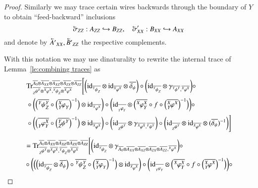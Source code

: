 \documentclass{amsart}
\def\tn{\textnormal}
\def\Trace{\tn{Tr}}
\def\ol{\overline}
\newcommand{\into}{\hookrightarrow}
\newcommand{\cev}[1]{\reflectbox{\ensuremath{\vec{\reflectbox{\ensuremath{#1}}}}}}
\def\id{\tn{id}}
\newcommand{\feeddd}[3]{{\tensor*[^{#2}_{\color{white}{!}}]{{#1}}{^{#3}}}}%
\newcommand{\feeddc}[3]{{\tensor*[^{#2}]{{#1}}{_{#3}}}}
\newcommand{\feedcd}[3]{{\tensor*[_{#2}]{{#1}}{^{#3}}}}
\newcommand{\feedcc}[3]{{\tensor*[^{\color{white}{!}}_{#2}]{{#1}}{_{#3}}}}
\newcommand{\feedda}[3]{{\tensor*[^{#2}_{\color{white}{!}}]{{#1}}{^{#2}_{#3}}}}
\newcommand{\feedca}[3]{{\tensor*[_{#2}]{{#1}}{_{#2}^{#3}}}}
\newcommand{\feedad}[3]{{\tensor*[^{#2}_{#3}]{{#1}}{^{#2}}}}
\newcommand{\feedac}[3]{{\tensor*[_{#2}^{#3}]{{#1}}{_{#2}}}}
\theoremstyle{remark}
\theoremstyle{definition}
\begin{document}
\begin{proof}
Similarly we may trace certain wires backwards through the boundary of $Y$ to obtain ``feed-backward'' inclusions
\[\cev{\sigma}_{ZZ}:A_{ZZ}\into B_{ZZ},\quad \cev{\sigma}'_{XX}:B_{XX}\into A_{XX}\]
and denote by $\cev{A'}_{XX},\cev{B'}_{ZZ}$ the respective complements.

With this notation we may use dinaturality to rewrite the internal trace of Lemma~\ref{le:combining traces} as
\begin{align*}
&\Trace^{\ol{A_0}\otimes\ol{A_{XX}}\otimes\ol{A_{XZ}}\otimes\ol{A_{ZX}}\otimes\ol{A_{ZZ}}}_{\ol{\feedcd{\psi}{Z}{Y}}\otimes\ol{\feeddd{\varphi}{X}{X}},\ol{\feeddc{\psi}{Y}{Z}}\otimes\ol{\feeddd{\varphi}{X}{X}}}\Bigg[\bigg(\id_{\ol{\feeddc{\psi}{Y}{Z}}}\otimes\id_{\ol{\feeddd{\varphi}{X}{X}}}\otimes\ol{\delta_\psi}\bigg)\circ
\bigg(\id_{\ol{\feeddc{\psi}{Y}{Z}}}\otimes\gamma_{\ol{\feeddd{\psi}{Y}{Y}},\ol{\feeddd{\varphi}{X}{X}}}\bigg)\circ\\
&\circ\bigg(\Big(\ol{\feedda{\psi}{Y}{Z}}\circ\Big(\ol{\feedac{\varphi}{Y}{X}}\Big)^{-1}\Big)\otimes\id_{\ol{\feeddd{\varphi}{X}{X}}}\bigg)\circ\bigg(\id_{\ol{\feedcc{\varphi}{Y}{Y}}}\otimes\Big(\ol{\feedda{\varphi}{X}{Y}}\circ f\circ\Big(\ol{\feedad{\varphi}{X}{Y}}\Big)^{-1}\Big)\bigg)\circ\\
&\circ\bigg(\Big(\ol{\feedca{\varphi}{Y}{X}}\circ\Big(\ol{\feedad{\psi}{Y}{Z}}\Big)^{-1}\Big)\otimes\id_{\ol{\feeddd{\varphi}{X}{X}}}\bigg)\circ\bigg(\id_{\ol{\feedcd{\psi}{Z}{Y}}}\otimes\gamma_{\ol{\feeddd{\varphi}{X}{X}},\ol{\feeddd{\psi}{Y}{Y}}}\bigg)\circ\bigg(\id_{\ol{\feedcd{\psi}{Z}{Y}}}\otimes\id_{\ol{\feeddd{\varphi}{X}{X}}}\otimes(\ol{\delta_\psi})^{-1}\bigg)\Bigg]\\
\end{align*}
\begin{align*}
&=\Trace^{\ol{A_0}\otimes\ol{A_{XX}}\otimes\ol{A_{XZ}}\otimes\ol{A_{ZX}}\otimes\ol{A_{ZZ}}}_{\ol{\feedcd{\psi}{Z}{Y}}\otimes\ol{\feeddd{\varphi}{X}{X}},\ol{\feeddc{\psi}{Y}{Z}}\otimes\ol{\feeddd{\varphi}{X}{X}}}\Bigg[
\bigg(\id_{\ol{\feeddc{\psi}{Y}{Z}}}\otimes\gamma_{\ol{A_0}\otimes\ol{A_{XX}}\otimes\ol{A_{XZ}}\otimes\ol{A_{ZX}}\otimes\ol{A_{ZZ}},\ol{\feeddd{\varphi}{X}{X}}}\bigg)\circ\\
&\circ\bigg(\Big(\Big(\id_{\ol{\feeddc{\psi}{Y}{Z}}}\otimes\ol{\delta_\psi}\Big)\circ\ol{\feedda{\psi}{Y}{Z}}\circ\Big(\ol{\feedac{\varphi}{Y}{X}}\Big)^{-1}\Big)\otimes\id_{\ol{\feeddd{\varphi}{X}{X}}}\bigg)\circ\bigg(\id_{\ol{\feedcc{\varphi}{Y}{Y}}}\otimes\Big(\ol{\feedda{\varphi}{X}{Y}}\circ f\circ\Big(\ol{\feedad{\varphi}{X}{Y}}\Big)^{-1}\Big)\bigg)\circ\\

\end{align*}
\end{proof}
\end{document}
